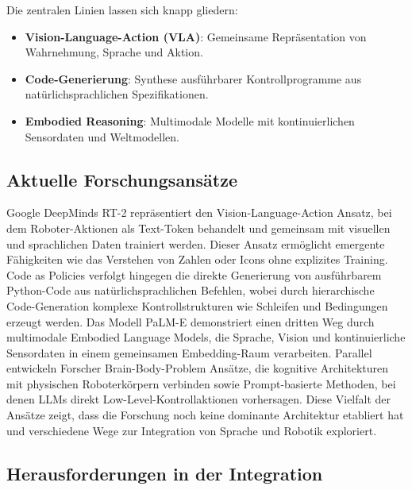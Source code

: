 Die zentralen Linien lassen sich knapp gliedern:
\begin{itemize}
  \item \textbf{Vision-Language-Action (VLA)}: Gemeinsame
    Repräsentation von Wahrnehmung, Sprache und Aktion.
  \item \textbf{Code-Generierung}: Synthese ausführbarer
    Kontrollprogramme aus natürlichsprachlichen Spezifikationen.
  \item \textbf{Embodied Reasoning}: Multimodale Modelle mit
    kontinuierlichen Sensordaten und Weltmodellen.
\end{itemize}

\subsection{Aktuelle Forschungsansätze}
Google DeepMinds RT-2 repräsentiert den Vision-Language-Action Ansatz, bei dem
Roboter-Aktionen als Text-Token behandelt und gemeinsam mit visuellen und
sprachlichen Daten trainiert werden. Dieser Ansatz ermöglicht emergente
Fähigkeiten wie das Verstehen von Zahlen oder Icons ohne explizites
Training. Code as Policies verfolgt hingegen die
direkte Generierung von ausführbarem Python-Code aus natürlichsprachlichen
Befehlen, wobei durch hierarchische Code-Generation komplexe
Kontrollstrukturen wie
Schleifen und Bedingungen erzeugt werden.
Das Modell PaLM-E demonstriert einen dritten Weg durch multimodale
Embodied Language Models, die
Sprache, Vision und kontinuierliche Sensordaten in einem gemeinsamen
Embedding-Raum verarbeiten. Parallel entwickeln
Forscher Brain-Body-Problem Ansätze, die kognitive Architekturen mit physischen
Roboterkörpern verbinden sowie Prompt-basierte Methoden, bei denen LLMs direkt
Low-Level-Kontrollaktionen vorhersagen. Diese Vielfalt der Ansätze zeigt, dass die Forschung noch
keine dominante Architektur etabliert hat und
verschiedene Wege zur Integration von Sprache und Robotik
exploriert.

\subsection{Herausforderungen in der Integration}

